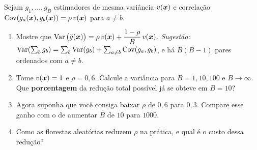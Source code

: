 \documentclass[11pt,a4paper]{article}
\begin{document}
\begin{exercicio}
Sejam $g_1,\dots,g_B$ estimadores de mesma variância $v(\bm{x})$ e correlação
$\operatorname{Cov}(g_a(\bm{x}),g_b(\bm{x}))=\rho\,v(\bm{x})$ para $a\neq b$.
\begin{enumerate}[label=(\alph*),leftmargin=1.1cm]
  \item Mostre que
        $\displaystyle \operatorname{Var}\big(\bar g(\bm{x})\big)
         = \rho\,v(\bm{x}) + \frac{1-\rho}{B}\,v(\bm{x})$.
        \emph{Sugestão:} $\operatorname{Var}(\sum_b g_b)=\sum_b\operatorname{Var}(g_b)+\sum_{a\neq b}\operatorname{Cov}(g_a,g_b)$,
        e há $B(B-1)$ pares ordenados com $a\neq b$.
  \item Tome $v(\bm{x})=1$ e $\rho=0{,}6$. Calcule a variância para
        $B=1,10,100$ e $B\to\infty$. Que \textbf{porcentagem} da redução total
        possível já se obteve em $B=10$?
  \item Agora suponha que você consiga baixar $\rho$ de $0{,}6$ para $0{,}3$.
        Compare esse ganho com o de aumentar $B$ de $10$ para $1000$.
  \item Como as florestas aleatórias reduzem $\rho$ na prática, e qual é o custo
        dessa redução?
\end{enumerate}
\end{exercicio}
\end{document}
